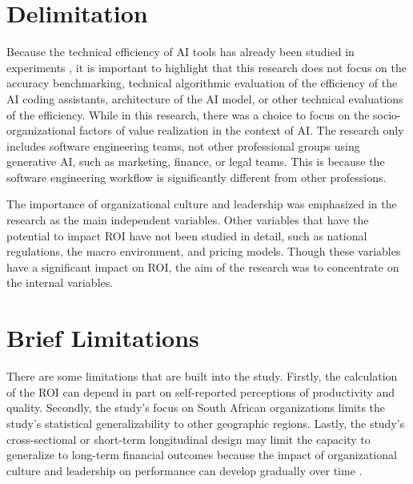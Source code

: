 \documentclass[11pt]{report}
\begin{document}
\chapter*{Delimitation}

Because the technical efficiency of AI tools has already been studied in experiments \autocite{Peng2023}, it is important to highlight that this research does not focus on the accuracy benchmarking, technical algorithmic evaluation of the efficiency of the AI coding assistants, architecture of the AI model, or other technical evaluations of the efficiency. While in this research, there was a choice to focus on the socio-organizational factors of value realization in the context of AI. The research only includes software engineering teams, not other professional groups using generative AI, such as marketing, finance, or legal teams. This is because the software engineering workflow is significantly different from other professions.

The importance of organizational culture and leadership was emphasized in the research as the main independent variables. Other variables that have the potential to impact ROI have not been studied in detail, such as national regulations, the macro environment, and pricing models. Though these variables have a significant impact on ROI, the aim of the research was to concentrate on the internal variables.

\chapter*{Brief Limitations}

There are some limitations that are built into the study. Firstly, the calculation of the ROI can depend in part on self-reported perceptions of productivity and quality. Secondly, the study's focus on South African organizations limits the study's statistical generalizability to other geographic regions. Lastly, the study's cross-sectional or short-term longitudinal design may limit the capacity to generalize to long-term financial outcomes because the impact of organizational culture and leadership on performance can develop gradually over time \autocite{An2024}.
\end{document}
